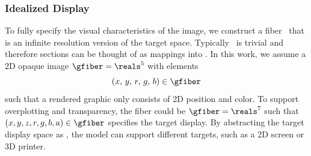 \documentclass[../main.tex]{subfiles}
\begin{document}
\subsubsection{Idealized Display \gfiber}
\label{sec:math:graphic:fiber}
To fully specify the visual characteristics of the image, we construct a fiber \gfiber\ that is an infinite resolution version of the target space. Typically \gtotal\ is trivial and therefore sections can be thought of as mappings into \gfiber. In this work, we assume a 2D opaque image $\gfiber=\reals^5$ with elements 
\begin{equation*}
(x,\, y,\, r,\, g,\, b) \in \gfiber
\end{equation*}
such that a rendered graphic only consists of 2D position and color. To support overplotting and transparency, the fiber could be $\gfiber=\reals^{7}$ such that $(x, y, z, r, g, b, a) \in \gfiber$ specifies the target display. By abstracting the target display space as \gfiber, the model can support different targets, such as a 2D screen or 3D printer. 
\end{document}
